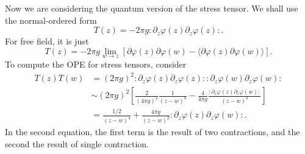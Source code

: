 \documentclass[aps,prb,superscriptaddress,nofootinbib]{revtex4}
\newcommand{\normord}[1]{{:\mathrel{#1}:}}
\begin{document}
Now we are considering the quantum version of the stress tensor.
We shall use the normal-ordered form
\begin{equation}
	T(z) = -2\pi g \normord{\partial_z\varphi(z) \partial_z\varphi(z)}.
\end{equation}
For free field, it is just
\begin{equation}
	T(z) = -2\pi g \lim_{w\rightarrow z}\left[\partial\varphi(z)\partial\varphi(w)-\langle\partial\varphi(z)\partial\varphi(w)\rangle\right].
\end{equation}
To compute the OPE for stress tensors, consider
\begin{equation}
\begin{aligned}
	T(z)T(w) 
	&= (2\pi g)^2 \normord{\partial_z\varphi(z) \partial_z\varphi(z)} \normord{\partial_z\varphi(w) \partial_z\varphi(w)} \\
	&\sim (2\pi g)^2 \left[\frac{2}{(4\pi g)^2}\frac{1}{(z-w)^4} - \frac{4}{4\pi g}\frac{\normord{\partial_z\varphi(z)\partial_z\varphi(w)}}{(z-w)^2}\right] \\
	&= \frac{1/2}{(z-w)^4} + \frac{4\pi g}{(z-w)^2}\normord{\partial_z\varphi(z)\partial_z\varphi(w)}.
\end{aligned}
\end{equation}
In the second equation, the first term is the result of two contractions, and the second the result of single contraction.
\end{document}
